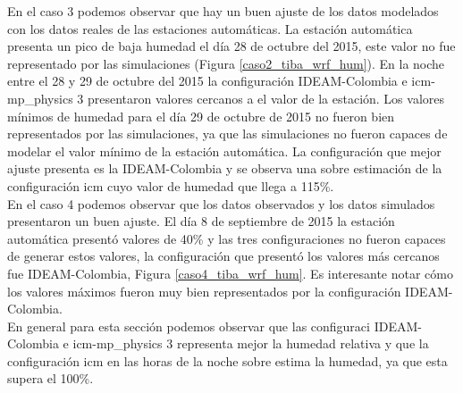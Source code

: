 En el caso 3 podemos observar que hay un buen ajuste de los datos modelados con los datos reales de las estaciones automáticas. La estación automática presenta un pico de baja humedad el día 28 de octubre del 2015, este valor no fue representado por las simulaciones (Figura \ref{caso2_tiba_wrf_hum}). En la noche entre el 28 y 29 de octubre del 2015 la configuración IDEAM-Colombia e icm-mp\_physics 3 presentaron valores cercanos a el valor de la estación. Los valores mínimos de humedad para el día 29 de octubre de 2015 no fueron bien representados por las simulaciones, ya que las simulaciones no fueron capaces de modelar el valor mínimo de la estación automática. La configuración que mejor ajuste presenta es la IDEAM-Colombia y se observa una sobre estimación de la configuración icm cuyo valor de humedad que llega a 115\%.\\

En el caso 4 podemos observar que los datos observados y los datos simulados presentaron un buen ajuste. El día 8 de septiembre de 2015 la estación automática presentó valores de 40\% y las tres configuraciones no fueron capaces de generar estos valores, la configuración que presentó los valores más cercanos fue IDEAM-Colombia, Figura \ref{caso4_tiba_wrf_hum}. Es interesante notar cómo los valores máximos fueron muy bien representados por la configuración IDEAM-Colombia.\\

En general para esta sección podemos observar que las configuraci IDEAM-Colombia e icm-mp\_physics 3 representa mejor la humedad relativa y que la configuración icm en las horas de la noche sobre estima la humedad, ya que esta supera el 100\%.


